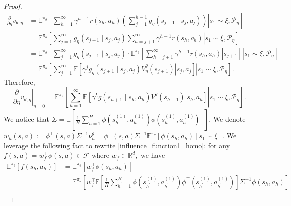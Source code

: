 \documentclass{article}
\numberwithin{equation}{section}
\begin{document}
\begin{proof}
\begin{align*}
    \frac{\partial}{\partial \eta} v_{\theta, \eta}
    &= \mathbb{E}^{\pi_{\theta}} \left[\left.\sum_{h=1}^{\infty}\gamma^{h-1}r\left(s_{h}, a_{h}\right)\left(\sum_{j=1}^{h-1} g_{\eta}\left(s_{j+1} \mid s_{j}, a_{j}\right)\right) \right| s_1 \sim \xi, \mathcal{P}_{\eta} \right] \\
    &= \mathbb{E}^{\pi_{\theta}} \left[\left.\sum_{j=1}^{\infty} g_{\eta}\left(s_{j+1} \mid s_{j}, a_{j}\right) \sum_{h=j+1}^\infty \gamma^{h-1}r\left(s_{h}, a_{h}\right) \right| s_1 \sim \xi, \mathcal{P}_{\eta} \right] \\
    &= \mathbb{E}^{\pi_{\theta}} \left[\left.\sum_{j=1}^{\infty} g_{\eta}\left(s_{j+1} \mid s_{j}, a_{j}\right) \cdot \mathbb{E}^{\pi_{\theta}} \left[\left.\sum_{h=j+1}^\infty\gamma^{h-1} r\left(s_{h}, a_{h}\right) \right| s_{j+1}\right]\right| s_1 \sim \xi, \mathcal{P}_{\eta} \right] \\
    &= \mathbb{E}^{\pi_{\theta}} \left[\left.\sum_{j=1}^{\infty} \mathbb{E}\left[\left. \gamma^{j}g_{\eta}\left(s_{j+1} \mid s_{j}, a_{j}\right) V_{\eta}^{\theta}(s_{j+1}) \right| s_j,a_j \right]\right| s_1 \sim \xi, \mathcal{P}_{\eta} \right].
\end{align*}
Therefore,
\begin{equation}\label{influence_function1_homo}
    \left.\frac{\partial}{\partial \eta} v_{\theta, \eta}\right|_{\eta=0} = \mathbb{E}^{\pi_{\theta}} \left[\left.\sum_{h=1}^{\infty} \mathbb{E}\left[\left. \gamma^h g\left(s_{h+1} \mid s_{h}, a_{h}\right) V^{\theta}(s_{h+1}) \right| s_h,a_h \right]\right| s_1 \sim \xi, \mathcal{P}_{\eta} \right].
\end{equation}
We notice that $\Sigma = \mathbb{E}\left[\frac{1}{H}\sum_{h=1}^H\phi\left(s_h^{(1)},a_h^{(1)}\right)\phi\left(s_h^{(1)},a_h^{(1)}\right)^{\top}\right]$. We denote $w_h(s,a) := \phi^{\top}(s,a)\Sigma^{-1} \nu_h^{\theta} = \phi^{\top}(s,a)\Sigma^{-1} \mathbb{E}^{\pi_{\theta}} \left[\phi(s_h,a_h) \mid s_1 \sim \xi\right].$ We leverage the following fact to rewrite \eqref{influence_function1_homo}: for any $f(s,a) = w_f^{\top} \phi(s,a) \in \mathcal{F}$ where $w_f \in \mathbb{R}^d,$ we have
\begin{align*}
\mathbb{E}^{\pi_{\theta}}\left[f(s_h,a_h)\right]
&= \mathbb{E}^{\pi_{\theta}} \left[ w_f^{\top} \phi(s_h,a_h)\right] \\
&= \mathbb{E}^{\pi_{\theta}} \left[ w_f^{\top} \mathbb{E}\left[\frac{1}{H}\sum_{h^\prime=1}^H\phi\left(s_{h^\prime}^{(1)},a_{h^\prime}^{(1)}\right)\phi^{\top}\left(s_{h^\prime}^{(1)},a_{h^\prime}^{(1)}\right)\right] \Sigma^{-1} \phi(s_h,a_h) \right] \\

\end{align*}
\end{proof}
\end{document}
